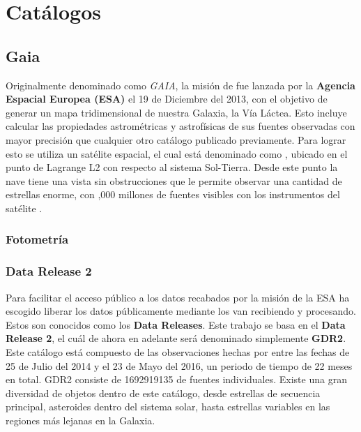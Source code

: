 \chapter{Catálogos}

\section{Gaia} \label{muestra:sec:gaia}

Originalmente denominado como \textit{GAIA}, la misión de \gaia fue lanzada por
la \textbf{Agencia Espacial Europea (ESA)} el 19 de Diciembre del 2013, con el
objetivo de generar un mapa tridimensional de nuestra Galaxia, la Vía Láctea.
Esto incluye calcular las propiedades astrométricas y astrofísicas de sus
fuentes observadas con mayor precisión que cualquier otro catálogo publicado
previamente. Para lograr esto se utiliza un satélite espacial, el cual está
denominado como \gaiaNoSpace, ubicado en el punto de Lagrange L2 con respecto al
sistema Sol-Tierra. Desde este punto la nave tiene una vista sin obstrucciones
que le permite observar una cantidad de estrellas enorme, con ,000 millones de fuentes visibles con los instrumentos del satélite
\gaiaNoSpace. 

\subsection{Fotometría}

\subsection{Data Release 2} \label{muestra:sec:gaia:dr2}

Para facilitar el acceso público a los datos recabados por la misión de \gaia la
ESA ha escogido liberar los datos públicamente mediante los van recibiendo y
procesando. Estos son conocidos como los \textbf{Data Releases}. Este trabajo se
basa en el \textbf{Data Release 2}, el cuál de ahora en adelante será denominado
simplemente \textbf{GDR2}. Este catálogo está compuesto de las observaciones
hechas por \gaia entre las fechas de 25 de Julio del 2014 y el 23 de Mayo del
2016, un periodo de tiempo de 22 meses en total.  GDR2 consiste
de \num{1692919135} de fuentes individuales. Existe una gran diversidad de objetos
dentro de este catálogo, desde estrellas de secuencia principal, asteroides
dentro del sistema solar, hasta estrellas variables en las regiones más lejanas
en la Galaxia.

